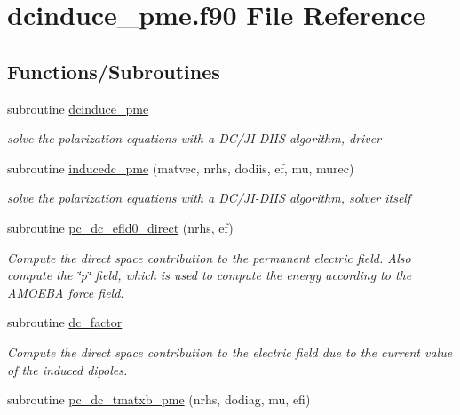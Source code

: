 \hypertarget{dcinduce__pme_8f90}{\section{dcinduce\-\_\-pme.\-f90 File Reference}
\label{dcinduce__pme_8f90}
}
\subsection*{Functions/\-Subroutines}
\begin{DoxyCompactItemize}
\item 
subroutine \hyperlink{dcinduce__pme_8f90_aa2aeb9307863b96b375f958764a9eceb}{dcinduce\-\_\-pme}
\begin{DoxyCompactList}\small\item\em solve the polarization equations with a D\-C/\-J\-I-\/\-D\-I\-I\-S algorithm, driver \end{DoxyCompactList}\item 
subroutine \hyperlink{dcinduce__pme_8f90_ace35c7c65a1eb765cba113147ed9eff6}{inducedc\-\_\-pme} (matvec, nrhs, dodiis, ef, mu, murec)
\begin{DoxyCompactList}\small\item\em solve the polarization equations with a D\-C/\-J\-I-\/\-D\-I\-I\-S algorithm, solver itself \end{DoxyCompactList}\item 
subroutine \hyperlink{dcinduce__pme_8f90_a32cc22a538c795cc14e8c09688890256}{pc\-\_\-dc\-\_\-efld0\-\_\-direct} (nrhs, ef)
\begin{DoxyCompactList}\small\item\em Compute the direct space contribution to the permanent electric field. Also compute the \char`\"{}p\char`\"{} field, which is used to compute the energy according to the A\-M\-O\-E\-B\-A force field. \end{DoxyCompactList}\item 
subroutine \hyperlink{dcinduce__pme_8f90_a291804e7ffd5e2a1f54e53097390f0a6}{dc\-\_\-factor}
\begin{DoxyCompactList}\small\item\em Compute the direct space contribution to the electric field due to the current value of the induced dipoles. \end{DoxyCompactList}\item 
subroutine \hyperlink{dcinduce__pme_8f90_a5823c4fa644f1f6e9ef59e7d2ad83591}{pc\-\_\-dc\-\_\-tmatxb\-\_\-pme} (nrhs, dodiag, mu, efi)

\end{DoxyCompactItemize}
